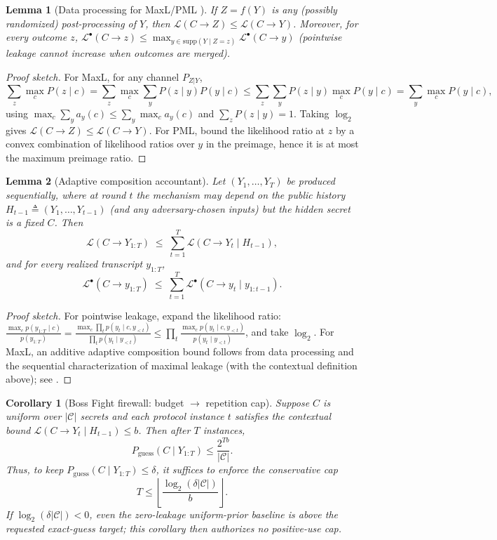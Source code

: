 \documentclass[11pt]{article}
\newcommand{\supp}{\mathrm{supp}}
\newcommand{\MaxL}{\mathcal{L}}
\newcommand{\PML}{\mathcal{L}^{\bullet}}
\newcommand{\logtwo}{\log_2}
\newcommand{\C}{\mathcal{C}} %
\newtheorem{lemma}{Lemma}
\newtheorem{corollary}{Corollary}
\begin{document}
\begin{lemma}[Data processing for MaxL/PML \cite{issa2020operational,saeidian2023pml}]\label{lem:dp}
If $Z=f(Y)$ is any (possibly randomized) post-processing of $Y$, then
$\MaxL(C\!\to\!Z)\le \MaxL(C\!\to\!Y)$.
Moreover, for every outcome $z$, $\PML(C\!\to\!z)\le \max_{y\in\supp(Y\mid Z=z)} \PML(C\!\to\!y)$ (pointwise leakage cannot increase when outcomes are merged).
\end{lemma}

\begin{proof}[Proof sketch]
For MaxL, for any channel $P_{Z|Y}$,
\[
\sum_z \max_c P(z\mid c)
=\sum_z \max_c \sum_y P(z\mid y)P(y\mid c)
\le \sum_z \sum_y P(z\mid y)\max_c P(y\mid c)
= \sum_y \max_c P(y\mid c),
\]
using $\max_c\sum_y a_y(c)\le \sum_y \max_c a_y(c)$ and $\sum_z P(z\mid y)=1$.
Taking $\logtwo$ gives $\MaxL(C\!\to\!Z)\le \MaxL(C\!\to\!Y)$.
For PML, bound the likelihood ratio at $z$ by a convex combination of likelihood ratios over $y$ in the preimage, hence it is at most the maximum preimage ratio.
\end{proof}


\begin{lemma}[Adaptive composition accountant]\label{lem:adaptive}
Let $(Y_1,\dots,Y_T)$ be produced sequentially, where at round $t$ the mechanism may depend on the public history $H_{t-1}\triangleq (Y_1,\dots,Y_{t-1})$ (and any adversary-chosen inputs) but the hidden secret is a fixed $C$.
Then
\[
\MaxL(C\!\to\!Y_{1:T}) \;\le\; \sum_{t=1}^{T}\MaxL(C\!\to\!Y_t \mid H_{t-1}),
\]
and for every realized transcript $y_{1:T}$,
\[
\PML(C\!\to\!y_{1:T}) \;\le\; \sum_{t=1}^{T}\PML(C\!\to\!y_t \mid y_{1:t-1}).
\]
\end{lemma}
\begin{proof}[Proof sketch]
For pointwise leakage, expand the likelihood ratio:
$\frac{\max_c p(y_{1:T}\mid c)}{p(y_{1:T})}
=\frac{\max_c \prod_t p(y_t\mid c,y_{<t})}{\prod_t p(y_t\mid y_{<t})}
\le \prod_t \frac{\max_c p(y_t\mid c,y_{<t})}{p(y_t\mid y_{<t})}$,
and take $\logtwo$.
For MaxL, an additive adaptive composition bound follows from data processing and the sequential characterization of maximal leakage (with the contextual definition above); see \cite{issa2020operational,issa2022adaptive,saeidian2023pml}.
\end{proof}

\begin{corollary}[Boss Fight firewall: budget $\rightarrow$ repetition cap]\label{cor:firewall}
Suppose $C$ is uniform over $|\C|$ secrets and each protocol instance $t$ satisfies the contextual bound $\MaxL(C\!\to\!Y_t\mid H_{t-1})\le b$.
Then after $T$ instances,
\[
P_{\mathrm{guess}}(C\mid Y_{1:T})\le \frac{2^{Tb}}{|\C|}.
\]
Thus, to keep $P_{\mathrm{guess}}(C\mid Y_{1:T})\le \delta$, it suffices to enforce the conservative cap
\[
T \le \left\lfloor \frac{\logtwo(\delta|\C|)}{b}\right\rfloor.
\]
If $\logtwo(\delta|\C|)<0$, even the zero-leakage uniform-prior baseline is above the requested exact-guess target; this corollary then authorizes no positive-use cap.
\end{corollary}
\end{document}

